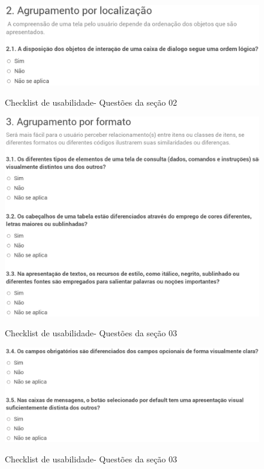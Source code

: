 	\begin{figure}[!h]
    	\centering
    	\includegraphics[keepaspectratio=true,scale=0.45]
      		{figuras/check02.eps}
    	\label{check02}
		\caption{Checklist de usabilidade- Questões da seção 02}
	\end{figure}

	\begin{figure}[!h]
    	\centering
    	\includegraphics[keepaspectratio=true,scale=0.45]
      		{figuras/check03.eps}
    	\label{check03}
		\caption{Checklist de usabilidade- Questões da seção 03}
	\end{figure}

	\begin{figure}[!h]
    	\centering
    	\includegraphics[keepaspectratio=true,scale=0.45]
      		{figuras/check03_2.eps}
    	\label{check03_2}
		\caption{Checklist de usabilidade- Questões da seção 03}
	\end{figure}

